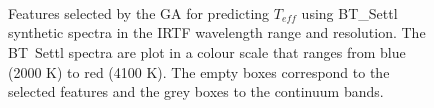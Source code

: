 \begin{figure}
 \captionsetup[subfloat]{farskip=2pt,captionskip=-18pt}
 \vspace*{-10pt}
 \\[-9ex]

 \\[-9ex]

 \\[-7ex]
%
 \caption{Features selected by the GA for predicting $T_{eff}$ using
    BT\_Settl synthetic spectra in the IRTF wavelength range
    and resolution. The BT\ Settl spectra are plot in a colour scale
    that ranges from blue (2000 K) to red (4100 K). The empty boxes
    correspond to the selected features and the grey boxes to the
    continuum bands.}
 \label{fig:IRTF-teff} 
\end{figure}

